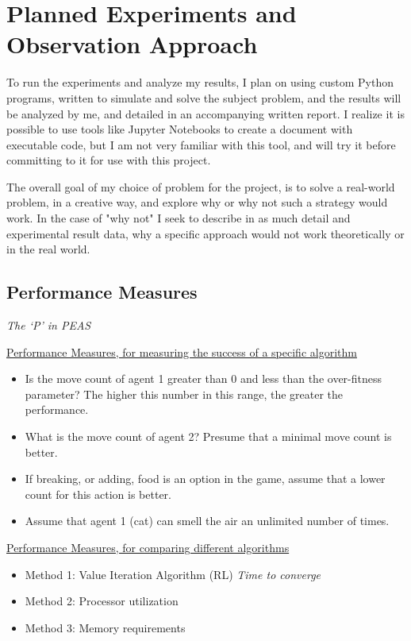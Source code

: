 \documentclass{article}
\begin{document}
\section{Planned Experiments and Observation Approach}

To run the experiments and analyze my results, I plan on using custom Python programs, written to simulate and solve the subject problem, and the results will be analyzed by me, and detailed in an accompanying written report. I realize it is possible to use tools like Jupyter Notebooks to create a document with executable code, but I am not very familiar with this tool, and will try it before committing to it for use with this project.

The overall goal of my choice of problem for the project, is to solve a real-world problem, in a creative way, and explore why or why not such a strategy would work. In the case of "why not" I seek to describe in as much detail and experimental result data, why a specific approach would not work theoretically or in the real world.

\subsection{Performance Measures}
\textit{The `P' in PEAS}

\underline{Performance Measures, for measuring the success of a specific algorithm}
\begin{itemize}
  \item Is the move count of agent 1 greater than 0 and less than the over-fitness parameter? The higher this number in this range, the greater the performance.
  \item What is the move count of agent 2? Presume that a minimal move count is better.
  \item If breaking, or adding, food is an option in the game, assume that a lower count for this action is better.
  \item Assume that agent 1 (cat) can smell the air an unlimited number of times.
\end{itemize}

\underline{Performance Measures, for comparing different algorithms}
\begin{itemize}
  \item Method 1: Value Iteration Algorithm (RL) \cite{mohan2014}
  \textit{Time to converge}
  \item Method 2: Processor utilization
  \item Method 3: Memory requirements
\end{itemize}
\end{document}
